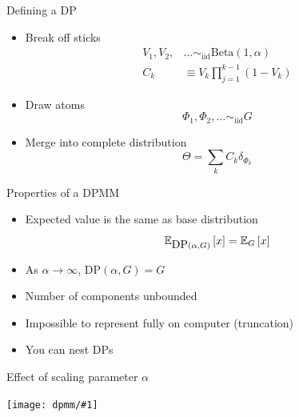 \documentclass[compress]{beamer}
\newcommand{\gfx}[2]{
\begin{center}
	\texttt{[image: dpmm/\#1]}
\end{center}
}
\begin{document}
\begin{frame}{Defining a DP}

	\begin{itemize}
		\item Break off sticks
                  \begin{align}
                    V_1, V_2, & \dots \sim_{\mbox{iid}} \mbox{Beta}(1,
                    \alpha) \\
                    C_k & \equiv V_k \prod_{j=1}^{k-1} (1 - V_k)
                  \end{align}
		\pause
		\item Draw atoms
                  \begin{equation}
                    \Phi_1, \Phi_2, \dots \sim_{\mbox{iid}} G
                  \end{equation}
		\pause
		\item Merge into complete distribution
                  \begin{equation}
                    \Theta = \sum_k C_k \delta_{\Phi_k}
                  \end{equation}
	\end{itemize}

\end{frame}

\begin{frame}{Properties of a DPMM}

	\begin{itemize}
		\item Expected value is the same as base distribution
		\begin{equation}
			\mathbb{E}_{\mbox{DP}(\alpha, G)}\left[ x \right] = \mathbb{E}_{G}\left[ x \right]
		\end{equation}
		\item As $\alpha \rightarrow \infty$, $\mbox{DP}(\alpha, G) = G$
		\item Number of components unbounded
		\item Impossible to represent fully on computer (truncation)
		\item You can nest DPs
	\end{itemize}

\end{frame}

\begin{frame}{Effect of scaling parameter $\alpha$}

	\gfx{dp-alpha}{.9}

\end{frame}
\end{document}
